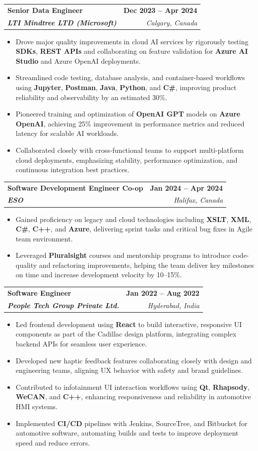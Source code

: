 \documentclass[letterpaper,11pt]{article}
\makeatletter
\newcommand{\resumeItem}[1]{
  \item\small{
    {#1 \vspace{-2pt}}
  }
}
\newcommand{\resumeSubheading}[4]{
  \vspace{-2pt}\item
    \begin{tabular*}{1.0\textwidth}[t]{l@{\extracolsep{\fill}}r}
      \textbf{#1} & \textbf{\small #2} \\
      \textit{\small#3} & \textit{\small #4} \\
    \end{tabular*}\vspace{-7pt}
}
\newcommand{\resumeItemListStart}{\begin{itemize}}
\newcommand{\resumeItemListEnd}{\end{itemize}\vspace{-5pt}}
\makeatother
\begin{document}
    \resumeSubheading
      {\textbf{Senior Data Engineer}}{\textbf{Dec 2023 -- Apr 2024}}
      {\textbf{LTI Mindtree LTD (Microsoft)}}{Calgary, Canada}
      \resumeItemListStart
        \resumeItem{Drove major quality improvements in cloud AI services by rigorously testing \textbf{SDKs}, \textbf{REST APIs} and collaborating on feature validation for \textbf{Azure AI Studio} and Azure OpenAI deployments.}
        \resumeItem{Streamlined code testing, database analysis, and container-based workflows using \textbf{Jupyter}, \textbf{Postman}, \textbf{Java}, \textbf{Python}, and \textbf{C\#}, improving product reliability and observability by an estimated 30\%.}
        \resumeItem{Pioneered training and optimization of \textbf{OpenAI GPT} models on \textbf{Azure OpenAI}, achieving 25\% improvement in performance metrics and reduced latency for scalable AI workloads.}
        \resumeItem{Collaborated closely with cross-functional teams to support multi-platform cloud deployments, emphasizing stability, performance optimization, and continuous integration best practices.}
      \resumeItemListEnd
    
    \resumeSubheading
      {\textbf{Software Development Engineer Co-op}}{\textbf{Jan 2024 -- Apr 2024}}
      {\textbf{ESO}}{Halifax, Canada}
      \resumeItemListStart
        \resumeItem{Gained proficiency on legacy and cloud technologies including \textbf{XSLT}, \textbf{XML}, \textbf{C\#}, \textbf{C++}, and \textbf{Azure}, delivering sprint tasks and critical bug fixes in Agile team environment.}
        \resumeItem{Leveraged \textbf{Pluralsight} courses and mentorship programs to introduce code-quality and refactoring improvements, helping the team deliver key milestones on time and increase development velocity by 10--15\%.}
      \resumeItemListEnd

    \resumeSubheading
      {\textbf{Software Engineer}}{\textbf{Jan 2022 -- Aug 2022}}
      {\textbf{People Tech Group Private Ltd.}}{Hyderabad, India}
      \resumeItemListStart
        \resumeItem{Led frontend development using \textbf{React} to build interactive, responsive UI components as part of the Cadillac design platform, integrating complex backend APIs for seamless user experience.}
        \resumeItem{Developed new haptic feedback features collaborating closely with design and engineering teams, aligning UX behavior with safety and brand guidelines.}
        \resumeItem{Contributed to infotainment UI interaction workflows using \textbf{Qt}, \textbf{Rhapsody}, \textbf{WeCAN}, and \textbf{C++}, enhancing responsiveness and reliability in automotive HMI systems.}
        \resumeItem{Implemented \textbf{CI/CD} pipelines with Jenkins, SourceTree, and Bitbucket for automotive software, automating builds and tests to improve deployment speed and reduce errors.}
      \resumeItemListEnd
\end{document}
